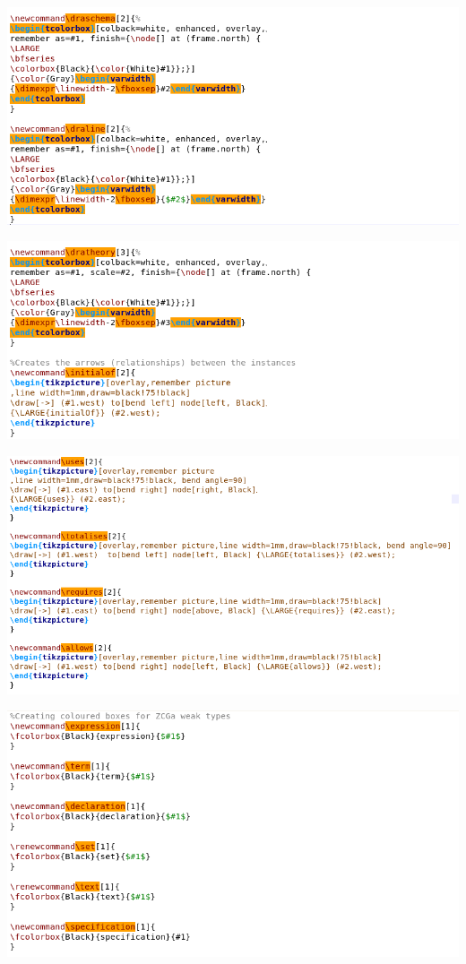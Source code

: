 \noindent \includegraphics[scale=0.5]{Figures/appendix/zmathb.png}

\noindent \includegraphics[scale=0.5]{Figures/appendix/zmathc.png}

\noindent \includegraphics[scale=0.5]{Figures/appendix/zmathd.png}

\noindent \includegraphics[scale=0.5]{Figures/appendix/zmathe.png}

